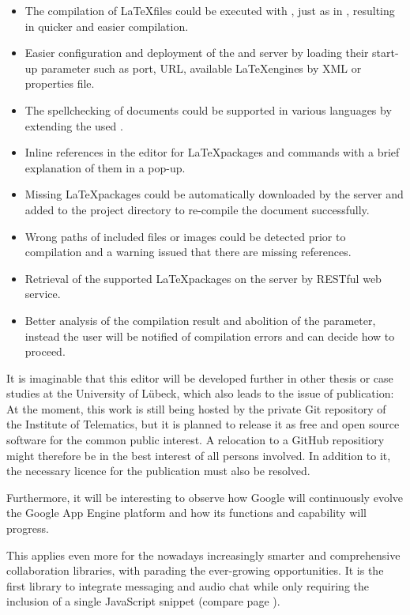 \begin{itemize}
	\item The compilation of \LaTeX files could be executed with , just as in , resulting in quicker and easier compilation.
	\item Easier configuration and deployment of the  and  server by loading their start-up parameter such as port, URL, available \LaTeX engines by XML or properties file.
	\item The spellchecking of documents could be supported in various languages by extending the used .
	\item Inline references in the editor for \LaTeX packages and commands with a brief explanation of them in a pop-up.
	\item Missing \LaTeX packages could be automatically downloaded by the  server and added to the project directory to re-compile the document successfully.
	\item Wrong paths of included files or images could be detected prior to compilation and a warning issued that there are missing references.
	\item Retrieval of the supported \LaTeX packages on the  server by RESTful web service.
	\item Better analysis of the compilation result and abolition of the  parameter, instead the user will be notified of compilation errors and can decide how to proceed.
\end{itemize}

It is imaginable that this editor will be developed further in other thesis or case studies at the University of Lübeck, which also leads to the issue of publication: At the moment, this work is still being hosted by the private Git repository of the Institute of Telematics, but it is planned to release it as free and open source software for the common public interest. A relocation to a GitHub repositiory might therefore be in the best interest of all persons involved. In addition to it, the necessary licence for the publication must also be resolved.

Furthermore, it will be interesting to observe how Google will continuously evolve the Google App Engine platform and how its functions and capability will progress.

This applies even more for the nowadays increasingly smarter and comprehensive collaboration libraries, with  parading the ever-growing opportunities. It is the first library to integrate messaging and audio chat while only requiring the inclusion of a single JavaScript snippet (compare page \pageref{together-js}).
